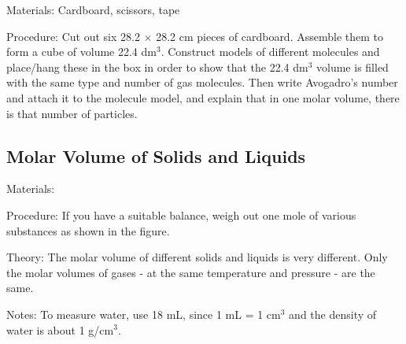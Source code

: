 \begin{multicols}{2}
\begin{description*}
\item[Materials:]{Cardboard, scissors, tape}
\item[Procedure:]{Cut out six 28.2 $\times$ 28.2 cm pieces of cardboard. Assemble them to form a cube of
volume 22.4 dm$^3$. Construct models of different
molecules and place/hang these in the box in
order to show that the 22.4 dm$^3$ volume is filled
with the same type and number of gas molecules.
Then write Avogadro's number and attach it to
the molecule model, and explain that in one
molar volume, there is that number of particles.}
\end{description*}

\subsection{Molar Volume of Solids and Liquids}


\begin{description*}
\item[Materials:]{}
\item[Procedure:]{If you have a suitable balance, weigh out one
mole of various substances as shown in the
figure.}
\item[Theory:]{The molar volume of different
solids and liquids is very different. Only the
molar volumes of gases - at the same temperature
and pressure - are the same.}
\item[Notes:]{To measure water, use 18 mL, since 1 mL = 1 cm$^3$ and the density of water is about 1 g/cm$^3$.}
\end{description*}


\end{multicols}
